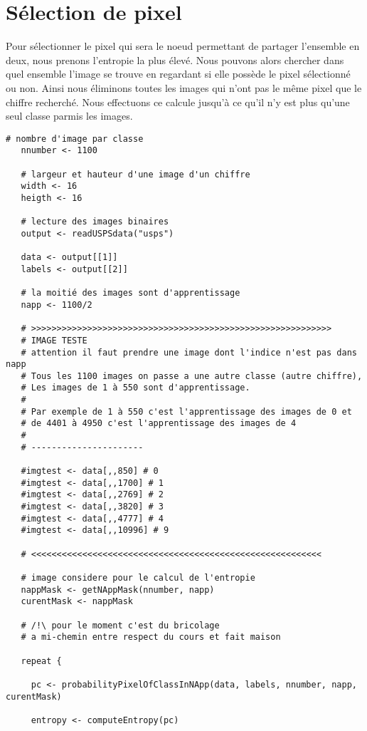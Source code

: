 \documentclass[a4paper,11pt]{article}
\begin{document}
  \section{Sélection de pixel}
  Pour sélectionner le pixel qui sera le noeud permettant de partager l'ensemble en deux, nous prenons
  l'entropie la plus élevé. Nous pouvons alors chercher dans quel ensemble l'image se trouve en regardant si
  elle possède le pixel sélectionné ou non. Ainsi nous éliminons toutes les images qui n'ont pas le même pixel
  que le chiffre recherché. Nous effectuons ce calcule jusqu'à ce qu'il n'y est plus qu'une seul classe parmis les 
  images.
  
  \begin{lstlisting}[caption=Algorithme principal du TP]
   # nombre d'image par classe
   nnumber <- 1100

   # largeur et hauteur d'une image d'un chiffre
   width <- 16
   heigth <- 16

   # lecture des images binaires
   output <- readUSPSdata("usps")

   data <- output[[1]]
   labels <- output[[2]]

   # la moitié des images sont d'apprentissage
   napp <- 1100/2

   # >>>>>>>>>>>>>>>>>>>>>>>>>>>>>>>>>>>>>>>>>>>>>>>>>>>>>>>>>>>
   # IMAGE TESTE
   # attention il faut prendre une image dont l'indice n'est pas dans napp
   # Tous les 1100 images on passe a une autre classe (autre chiffre),
   # Les images de 1 à 550 sont d'apprentissage.
   #
   # Par exemple de 1 à 550 c'est l'apprentissage des images de 0 et 
   # de 4401 à 4950 c'est l'apprentissage des images de 4
   #
   # ----------------------

   #imgtest <- data[,,850] # 0
   #imgtest <- data[,,1700] # 1
   #imgtest <- data[,,2769] # 2
   #imgtest <- data[,,3820] # 3
   #imgtest <- data[,,4777] # 4
   #imgtest <- data[,,10996] # 9

   # <<<<<<<<<<<<<<<<<<<<<<<<<<<<<<<<<<<<<<<<<<<<<<<<<<<<<<<<<

   # image considere pour le calcul de l'entropie
   nappMask <- getNAppMask(nnumber, napp)
   curentMask <- nappMask

   # /!\ pour le moment c'est du bricolage
   # a mi-chemin entre respect du cours et fait maison

   repeat {

     pc <- probabilityPixelOfClassInNApp(data, labels, nnumber, napp, curentMask)

     entropy <- computeEntropy(pc)


\end{lstlisting}
\end{document}
